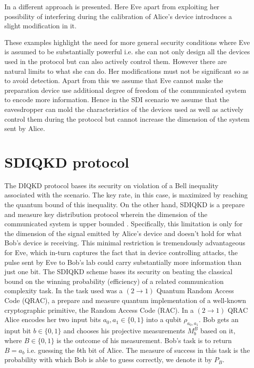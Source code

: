 \documentclass[smallextended]{svjour3}
\begin{document}
In \cite{mAlice} a different approach is presented. Here Eve apart from exploiting her possibility of interfering during the calibration of Alice's device introduces a slight modification in it.

These examples highlight the need for more general security conditions where Eve is assumed to be substantially powerful i.e. she can not only design all the devices used in the protocol but can also actively control them. However there are natural limits to what she can do. Her modifications must not be significant so as to avoid detection. Apart from this we assume that Eve cannot make the preparation device use additional degree of freedom of the communicated system to encode more information. Hence in the SDI scenario we assume that the eavesdropper can mold the characteristics of the devices used as well as actively control them during the protocol but cannot increase the dimension of the system sent by Alice.

\section{\label{sec:level1}SDIQKD protocol}
The DIQKD protocol bases its security on violation of a Bell inequality \cite{bell1964einstein} associated with the scenario. The key rate, in this case, is maximized by reaching the quantum bound of this inequality. On the other hand, SDIQKD is a prepare and measure key distribution protocol wherein the dimension of the communicated system is upper bounded \cite{pawlowski2011semi}. Specifically, this limitation is only for the dimension of the signal emitted by Alice's device and doesn't hold for what Bob's device is receiving. This minimal restriction is tremendously advantageous for Eve, which in-turn captures the fact that in device controlling attacks, the pulse sent by Eve to Bob's lab could carry substantially more information than just one bit.
The SDIQKD scheme bases its security on beating the classical bound on the winning probability (efficiency) of a related communication complexity task. In \cite{pawlowski2011semi} the task used was a $(2\to 1)$ Quantum Random Access Code (QRAC)\cite{qrac}, a prepare and measure quantum implementation of a well-known cryptographic primitive, the Random Access Code (RAC).
In a $(2\to 1)$ QRAC Alice encodes her two input bits $a_0,a_1\in\{0,1\}$ into a qubit $\rho_{a_0,a_1}$. Bob gets an input bit $b\in\{0,1\}$ and chooses his projective measurements $M_b^B$ based on it, where $B\in \{0,1\}$ is the outcome of his measurement. Bob's task is to return $B=a_b$ i.e. guessing the $b$th bit of Alice. The measure of success in this task is the probability with which Bob is able to guess correctly, we denote it by $P_B$.
\end{document}
